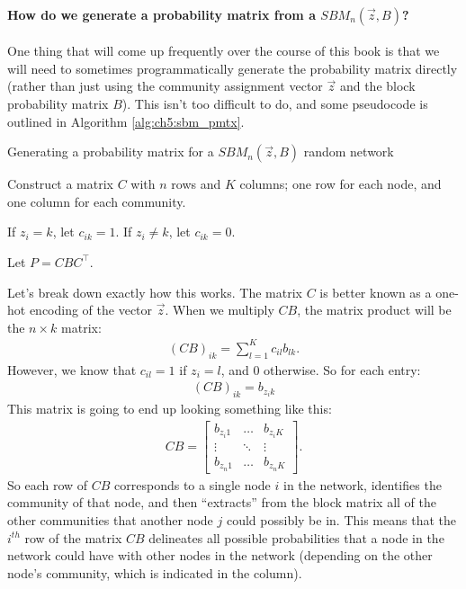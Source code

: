 \paragraph{How do we generate a probability matrix from a $SBM_n(\vec z, B)$?}
\label{sec:ch5:ier:sbm_pmtx}
One thing that will come up frequently over the course of this book is that we will need to sometimes programmatically generate the probability matrix directly (rather than just using the community assignment vector $\vec z$ and the block probability matrix $B$). This isn't too difficult to do, and some pseudocode is outlined in Algorithm \ref{alg:ch5:sbm_pmtx}.

\begin{algorithm}[h]\caption{Generating a probability matrix for a $SBM_n(\vec z, B)$ random network}
\label{alg:ch5:sbm_pmtx}
\SetAlgoLined
{}

Construct a matrix $C$ with $n$ rows and $K$ columns; one row for each node, and one column for each community.

 {
     {
        If $z_i = k$, let $c_{ik} = 1$. If $z_i \neq k$, let $c_{ik} = 0$.
    }
}

Let $P = CBC^\top$.
\end{algorithm}

Let's break down exactly how this works. The matrix $C$ is better known as a one-hot encoding of the vector $\vec z$. When we multiply $CB$, the matrix product will be the $n \times k$ matrix:
\begin{align*}
    (CB)_{ik} = \sum_{l = 1}^Kc_{il} b_{lk}.
\end{align*}
However, we know that $c_{il} = 1$ if $z_i = l$, and $0$ otherwise. So for each entry:
\begin{align*}
    (CB)_{ik} = b_{z_i k}
\end{align*}
This matrix is going to end up looking something like this:
\begin{align*}
    CB = \begin{bmatrix}
        b_{z_i1} & \hdots & 
        b_{z_iK} \\
        \vdots & \ddots & \vdots \\
        b_{z_n1} & \hdots & b_{z_n K}
    \end{bmatrix}.
\end{align*}
So each row of $CB$ corresponds to a single node $i$ in the network, identifies the community of that node, and then ``extracts'' from the block matrix all of the other communities that another node $j$ could possibly be in. This means that the $i^{th}$ row of the matrix $CB$ delineates all possible probabilities that a node in the network could have with other nodes in the network (depending on the other node's community, which is indicated in the column).

